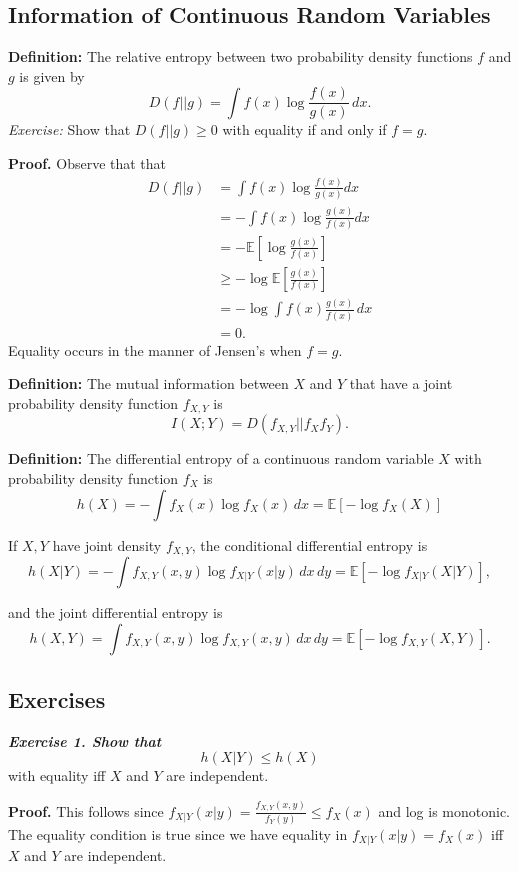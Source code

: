 \documentclass[12pt]{extarticle}
\begin{document}
\subsection{Information of Continuous Random Variables}
\textbf{Definition:} The relative entropy between two probability density functions $f$ and $g$ is given by
\[
D(f||g) = \int f(x) \log \frac{f(x)}{g(x)} \, dx.
\]
{\it Exercise:} Show that $D(f||g) \geq 0$ with equality if and only if $f = g$.

\textbf{Proof.} Observe that that
\begin{align*}
D(f||g)&=\int f(x)\log\frac{f(x)}{g(x)}dx\\
&=-\int f(x)\log\frac{g(x)}{f(x)}dx\\
&=-\mathbb{E}\left [\log\frac{g(x)}{f(x)} \right]\\
&\geq-\log\mathbb{E}\left [\frac{g(x)}{f(x)} \right ]\\
&=-\log\int f(x)\frac{g(x)}{f(x)} \, dx \\
&=0.
\end{align*}
Equality occurs in the manner of Jensen's when $f=g.$

\textbf{Definition:} The mutual information between $X$ and $Y$ that have a joint probability density function $f_{X, Y}$ is
\[
I(X; Y) = D(f_{X, Y} || f_X f_Y).
\]

\textbf{Definition:} The differential entropy of a continuous random variable $X$ with probability density function $f_X$ is
\[
h(X) = - \int f_X(x) \log f_X(x) \, dx = \mathbb{E} \left [ - \log f_X(X) \right ]
\]

If $X, Y$ have joint density $f_{X, Y}$, the conditional differential entropy is
\[
h(X|Y) = - \int f_{X, Y} (x, y) \log f_{X|Y} (x|y) \, dx \, dy = \mathbb{E} [ - \log f_{X|Y} (X|Y)],
\]

and the joint differential entropy is
\[
h(X, Y) = \int f_{X, Y} (x, y) \log f_{X, Y} (x, y) \, dx \, dy = \mathbb{E} [- \log f_{X, Y} (X, Y)].
\]

\subsection{Exercises}
\textbf{\textit{Exercise 1.  Show that}}
\[
h(X | Y ) \leq h(X)
\]
with equality iff $X$ and $Y$ are independent.

\textbf{Proof.} This follows since $f_{X|Y}(x|y)=\frac{f_{X,Y}(x,y)}{f_{Y}(y)}\leq f_X(x)$ and log is monotonic. The equality condition is true since we have equality in $f_{X|Y}(x|y)=f_X(x)$ iff $X$ and $Y$ are independent.
\end{document}
